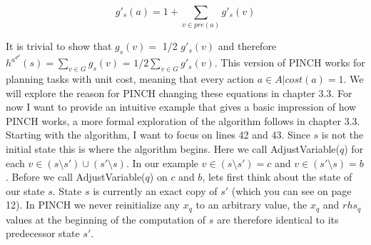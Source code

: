\begin{equation}
    g'_s(a) = 1 + \sum_{v \in pre(a)}^{} g'_s(v)
\end{equation}

It is trivial to show that $g_s(v) =$ 1/2 $g'_s(v)$ and therefore $h^a^d^d(s) = \sum_{v \in G}^{} g_s(v)$ = $1/2 \sum_{v \in G}^{} g'_s(v)$.\cite{main} This version of PINCH works for planning tasks with unit cost, meaning that every action $a \in A | cost(a) = 1$. We will explore the reason for PINCH changing these equations in chapter 3.3. For now I want to provide an intuitive example that gives a basic impression of how PINCH works, a more formal exploration of the algorithm follows in chapter 3.3.  \\

Starting with the algorithm, I want to focus on lines 42 and 43. Since $s$ is not the initial state this is where the algorithm begins. Here we call AdjustVariable($q$) for each $v \in (s \setminus s') \cup (s' \setminus s)$. In our example $ v \in (s \setminus s') = c$ and $v \in (s' \setminus s) = b$. Before we call AdjustVariable($q$) on $c$ and $b$, lets first think about the state of our state $s$. State $s$ is currently an exact copy of $s'$ (which you can see on page 12). In PINCH we never reinitialize any $x_q$ to an arbitrary value, the $x_q$ and $rhs_q$ values at the beginning of the computation of $s$ are therefore identical to its predecessor state $s'$. \\

